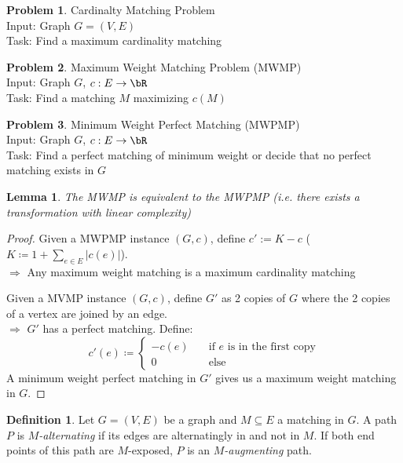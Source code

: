\documentclass[11pt, a4paper]{article}
\newcommand{\abs}[1]{\left\lvert#1\right\rvert}
\newtheorem{lemma}[theorem]{Lemma}
\theoremstyle{remark}
\theoremstyle{definition}
\newtheorem{definition}[theorem]{Definition}
\newtheorem*{problem}{Problem}
\begin{document}
\begin{problem}{Cardinalty Matching Problem}\\
	Input: Graph $G=(V,E)$ \\
	Task: Find a maximum cardinality matching
\end{problem}

\begin{problem}{Maximum Weight Matching Problem (MWMP)}\\
	Input: Graph $G$, $c:E\to \bR$ \\
	Task: Find a matching $M$ maximizing $c(M)$
\end{problem}

\begin{problem}{Minimum Weight Perfect Matching (MWPMP)}\\
	Input: Graph $G$, $c:E\to\bR$\\
	Task: Find a perfect matching of minimum weight or decide that no
	perfect matching exists in $G$
\end{problem}

\begin{lemma}
	The MWMP is equivalent to the MWPMP (i.e. there exists a transformation
	with linear complexity)
\end{lemma}
\begin{proof}
	Given a MWPMP instance $(G,c)$, define $c':=K-c$
	($K\coloneqq 1+\sum_{e\in E}\abs{c(e)}$). \\
	$\Rightarrow$ Any maximum weight matching is a maximum cardinality
	matching
	
	Given a MVMP instance $(G,c)$, define $G'$ as 2 copies of $G$ where
	the 2 copies of a vertex are joined by an edge. \\
	$\Rightarrow$ $G'$ has a perfect matching. Define:
	\[c'(e)\coloneqq \begin{cases}
		-c(e) \quad&\text{if $e$ is in the first copy} \\
		0 &\text{else}
	\end{cases}\]
	A minimum weight perfect matching in $G'$ gives us a maximum weight
	matching in $G$.
\end{proof}

\begin{definition}
	Let $G=(V,E)$ be a graph and $M\subseteq E$ a matching in $G$.
	A path $P$ is \emph{$M$-alternating} if its edges are alternatingly
	in and not in $M$. If both end points of this path are $M$-exposed,
	$P$ is an \emph{$M$-augmenting} path.
\end{definition}
\end{document}
